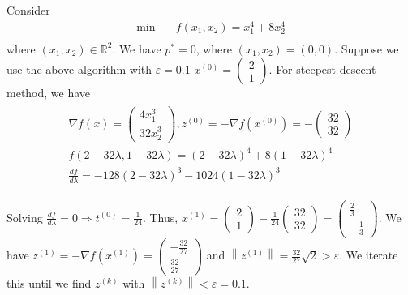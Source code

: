 \begin{example}
    Consider
    \begin{align*}
        \min &\quad f(x_1, x_2) = x_1^4 + 8x_2^4 \\
    \end{align*}
    where $(x_1, x_2)\in \mathbb{R}^2$. We have $p^* = 0$, where $(x_1, x_2) = (0, 0)$. Suppose we use the above algorithm with $\varepsilon = 0.1$ $x^{(0)}=\left(\begin{array}{l}2 \\ 1\end{array}\right)$. For steepest descent method, we have
\begin{align*}
\begin{gathered}
\nabla f(x)=\left(\begin{array}{l}
4 x_1^3 \\
32 x_2^3
\end{array}\right), z^{(0)}=-\nabla f\left(x^{(0)}\right)=-\left(\begin{array}{l}
32 \\
32
\end{array}\right) \\
f(2-32 \lambda, 1-32 \lambda)=(2-32 \lambda)^4+8(1-32 \lambda)^4 \\
\frac{d f}{d \lambda}=-128(2-32 \lambda)^3-1024(1-32 \lambda)^3
\end{gathered}
\end{align*}

    Solving $\frac{d f}{d \lambda}=0 \Rightarrow t^{(0)}=\frac{1}{24}$. Thus, $x^{(1)}=\left(\begin{array}{l}2 \\ 1\end{array}\right)-\frac{1}{24}\left(\begin{array}{c}32 \\ 32\end{array}\right)=\left(\begin{array}{c}\frac{2}{3} \\ -\frac{1}{3}\end{array}\right)$. We have $z^{(1)}=-\nabla f\left(x^{(1)}\right)=\left(\begin{array}{c}-\frac{32}{27} \\ \frac{32}{27}\end{array}\right)$ and $\left\|z^{(1)}\right\|=\frac{32}{27} \sqrt{2}>\varepsilon$. We iterate this until we find $z^{(k)}$ with $\left\|z^{(k)}\right\|<\varepsilon=0.1$.


\end{example}
